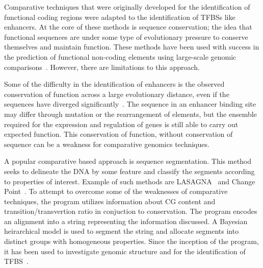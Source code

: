 

        Comparative techniques that were originally developed for the identification of functional coding regions were adapted to the identification of TFBSs like enhancers. At the core of these methods is sequence conservation; the idea that functional sequences are under some type of evolutionary pressure to conserve themselves and maintain function. These methods have been used with success in the prediction of functional non-coding elements using large-scale genomic comparisons~\cite{aparicio2002whole, gottgens2000analysis, loots2000identification, mouse2002initial}. However, there are limitations to this approach.

        Some of the difficulty in the identification of enhancers is the observed conservation of function across a large evolutionary distance, even if the sequences have diverged significantly~\cite{tautz2000evolution, pennacchio2013enhancers}. The sequence in an enhancer binding site may differ through mutation or the rearrangement of elements, but the ensemble required for the expression and regulation of genes is still able to carry out expected function. This conservation of function, without conservation of sequence can be a weakness for comparative genomics techniques. 
        
        A popular comparative based approach is sequence segmentation. This method seeks to delineate the DNA by some feature and classify the segments according to properties of interest.
        Example of such methods are LASAGNA~\cite{lee2013lasagna} and Change Point~\cite{keith2006segmenting}. To attempt to overcome some of the weaknesses of comparative techniques, the program utilizes information about CG content and transition/transvertion ratio in conjuction to conservation. The program encodes an alignment into a string representing the information discussed. A Bayesian heirarchical model is used to segment the string and allocate segments into distinct groups with homogeneous properties. Since the inception of the program, it has been used to investigate genomic structure and for the identification of TFBS~\cite{algama2014investigating, algama2017genome}. 

